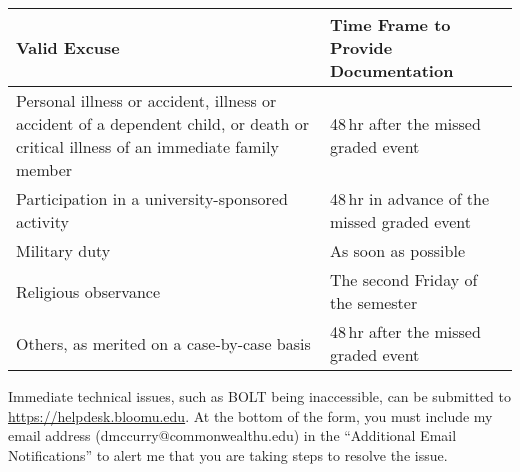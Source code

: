 \documentclass[11pt,letterpaper]{article}
\begin{document}
	\begin{center}
		\renewcommand\arraystretch{1.25}
\begin{tabularx}{\linewidth} {X X}
	\toprule
	\bfseries Valid Excuse & \bfseries Time Frame to Provide Documentation
	\\ \midrule
	Personal illness or accident, illness or accident of a dependent child,
	or death or critical illness of an immediate family member &
	48\,hr after the missed graded event \\
	Participation in a university-sponsored activity &
	48\,hr in advance of the missed graded event \\
	Military duty & As soon as possible \\
	Religious observance & The second Friday of the semester \\
	Others, as merited on a case-by-case basis & 48\,hr after the
	missed graded event \\
	\bottomrule
\end{tabularx}
\end{center}

Immediate technical issues, such as BOLT being inaccessible, can be submitted to
\url{https://helpdesk.bloomu.edu}. At the bottom of the form, you must include
my email address (dmccurry@commonwealthu.edu) in the ``Additional Email Notifications''
to alert me that you are taking steps to resolve the issue.
\end{document}
